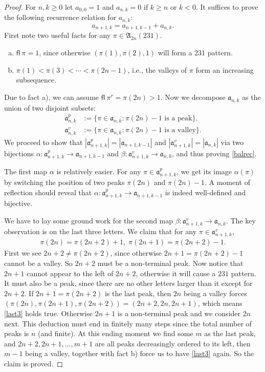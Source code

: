 \documentclass[12pt,reqno]{amsart}
\numberwithin{equation}{section}
\theoremstyle{plain}
\theoremstyle{definition}
\def\A{\mathfrak{A}}
\def\a{\mathfrak{a}}
\def\fl{\mathsf{fl}}
\begin{document}
\begin{proof}
For $n,k\geq 0$ let $a_{0,0}=1$ and $a_{n, k}=0$ if $k\geq n$ or $k<0$.
It suffices to prove
the following  recurrence relation for $a_{n, k}$:
\begin{equation}\label{balrec}
a_{n+1, k}=a_{n+1, k-1}+a_{n,k}.
\end{equation}
First note two useful facts for any $\pi\in\A_{2n}(231)$.
\begin{enumerate}[a)]
\item $\fl\:\pi=1$, since otherwise $(\pi(1), \pi(2), 1)$ will form a $231$ pattern.
\item $\pi(1)<\pi(3)<\cdots<\pi(2n-1)$, i.e., the valleys of $\pi$ form an increasing subsequence.
\end{enumerate}
Due to fact a), we can assume $\fl\:\pi^r=\pi(2n)>1$. Now we decompose $\a_{n,k}$ as the union of two disjoint subsets:
\begin{align*}
\a^{p}_{n,k}&:=\{\pi\in\a_{n,k} : \pi(2n)-1 \text{ is a peak}\},\\
\a^{v}_{n,k}&:=\{\pi\in\a_{n,k} : \pi(2n)-1 \text{ is a valley}\}.
\end{align*}
We proceed to show that $|\a^{p}_{n+1,k}|=|\a_{n+1,k-1}|$ and $|\a^{v}_{n+1,k}|=|\a_{n,k}|$ via two bijections $\alpha: \a^{p}_{n+1,k}\rightarrow\a_{n+1,k-1}$ and $\beta: \a^{v}_{n+1,k}\rightarrow \a_{n,k}$, and thus proving \eqref{balrec}.

The first map $\alpha$ is relatively easier. For any $\pi\in\a^{p}_{n+1,k}$, we get its image $\alpha(\pi)$ by switching the position of two peaks $\pi(2n)$ and $\pi(2n)-1$. A moment of reflection should reveal that $\alpha: \a^{p}_{n+1,k}\rightarrow\a_{n+1,k-1}$ is indeed well-defined and bijective.

We have to lay some ground work for the second map $\beta: \a^{v}_{n+1,k}\rightarrow \a_{n,k}$. The key observation is on the last three letters. We claim that for any $\pi\in\a^{v}_{n+1,k}$,
\begin{align}\label{last3}
\pi(2n)=\pi(2n+2)+1,\;\pi(2n+1)=\pi(2n+2)-1.
\end{align}
First we see $2n+2\neq \pi(2n+2)$, since otherwise $2n+1=\pi(2n+2)-1$ cannot be a valley. So $2n+2$ must be a non-terminal peak. Now notice that $2n+1$ cannot appear to the left of $2n+2$, otherwise it will cause a $231$ pattern. It must also be a peak, since there are no other letters larger than it except for $2n+2$. If $2n+1=\pi(2n+2)$ is the last peak, then $2n$ being a valley forces $(\pi(2n),\pi(2n+1),\pi(2n+2))=(2n+2,2n,2n+1)$, which means \eqref{last3} holds true. Otherwise $2n+1$ is a non-terminal peak and we consider $2n$ next. This deduction must end in finitely many steps since the total number of peaks is $n$ (and finite). At this ending moment we find some $m$ as the last peak, and $2n+2, 2n+1, \ldots, m+1$ are all peaks decreasingly ordered to its left, then $m-1$ being a valley, together with fact b) force us to have \eqref{last3} again. So the claim is proved.


\end{proof}
\end{document}
